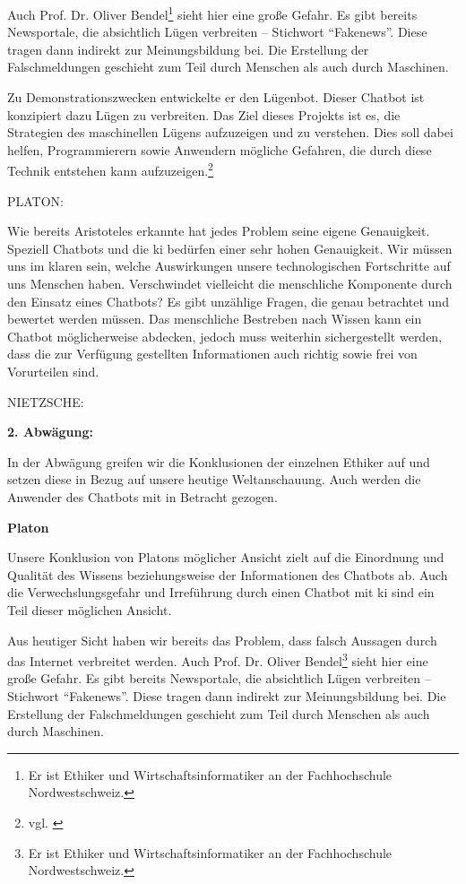Auch Prof. Dr. Oliver Bendel\footnote{Er ist Ethiker und Wirtschaftsinformatiker an der Fachhochschule Nordwestschweiz.} sieht hier eine große Gefahr. 
Es gibt bereits Newsportale, die absichtlich Lügen verbreiten -- Stichwort \enquote{Fakenews}. 
Diese tragen dann indirekt zur Meinungsbildung bei. 
Die Erstellung der Falschmeldungen geschieht zum Teil durch Menschen als auch durch Maschinen. 

Zu Demonstrationszwecken entwickelte er den Lügenbot. Dieser Chatbot ist konzipiert dazu Lügen zu verbreiten. 
Das Ziel dieses Projekts ist es, die Strategien des maschinellen Lügens aufzuzeigen und zu verstehen. 
Dies soll dabei helfen, Programmierern sowie Anwendern mögliche Gefahren, die durch diese Technik entstehen kann aufzuzeigen.\footnote{vgl. \cite{Bendel}} 

PLATON:

Wie bereits Aristoteles erkannte hat jedes Problem seine eigene Genauigkeit. Speziell Chatbots und die \ac{ki} bedürfen einer sehr hohen Genauigkeit. Wir müssen uns im klaren sein, welche Auswirkungen unsere technologischen Fortschritte auf uns Menschen haben. Verschwindet vielleicht die menschliche Komponente durch den Einsatz eines Chatbots? 
Es gibt unzählige Fragen, die genau betrachtet und bewertet werden müssen. 
Das menschliche Bestreben nach Wissen kann ein Chatbot möglicherweise abdecken, jedoch muss weiterhin sichergestellt werden, dass die zur Verfügung gestellten Informationen auch richtig sowie frei von Vorurteilen sind.

NIETZSCHE:


\textbf{2. Abwägung:}


In der Abwägung greifen wir die Konklusionen der einzelnen Ethiker auf und setzen diese in Bezug auf unsere heutige Weltanschauung. Auch werden die Anwender des Chatbots mit in Betracht gezogen.

\textbf{Platon}

Unsere Konklusion von Platons möglicher Ansicht zielt auf die Einordnung und Qualität des Wissens beziehungsweise der Informationen des Chatbots ab. Auch die Verwechslungsgefahr und Irreführung durch einen Chatbot mit \ac{ki} sind ein Teil dieser möglichen Ansicht.

Aus heutiger Sicht haben wir bereits das Problem, dass falsch Aussagen durch das Internet verbreitet werden. Auch Prof. Dr. Oliver Bendel\footnote{Er ist Ethiker und Wirtschaftsinformatiker an der Fachhochschule Nordwestschweiz.} sieht hier eine große Gefahr. 
Es gibt bereits Newsportale, die absichtlich Lügen verbreiten -- Stichwort \enquote{Fakenews}. 
Diese tragen dann indirekt zur Meinungsbildung bei. 
Die Erstellung der Falschmeldungen geschieht zum Teil durch Menschen als auch durch Maschinen. 

